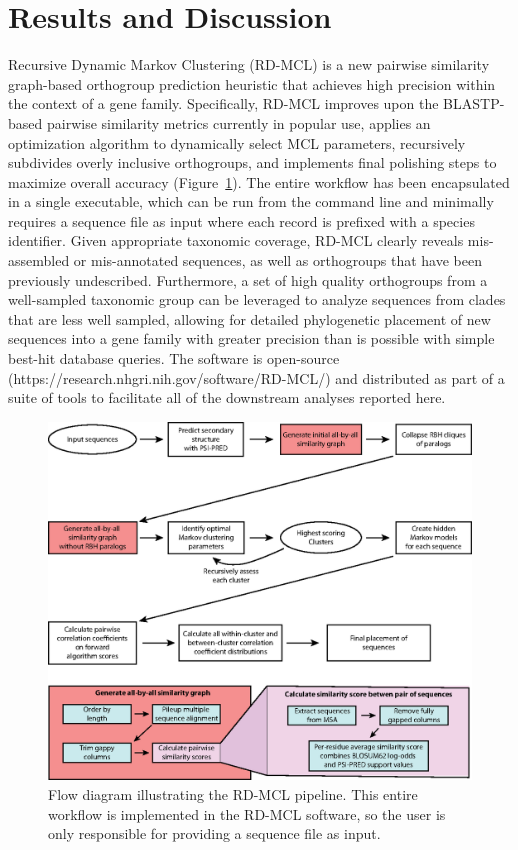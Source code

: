 \documentclass[twocolumn]{bmcart}  %
\begin{document}
\section{Results and Discussion}\label{sec:resultsAndDiscussion}
Recursive Dynamic Markov Clustering (RD-MCL) is a new pairwise similarity graph-based orthogroup prediction heuristic that achieves high precision within the context of a gene family.
Specifically, RD-MCL improves upon the BLASTP-based pairwise similarity metrics currently in popular use, applies an optimization algorithm to dynamically select MCL parameters, recursively subdivides overly inclusive orthogroups, and implements final polishing steps to maximize overall accuracy (Figure~\ref{fig:pipeline}).
The entire workflow has been encapsulated in a single executable, which can be run from the command line and minimally requires a sequence file as input where each record is prefixed with a species identifier.
Given appropriate taxonomic coverage, RD-MCL clearly reveals mis-assembled or mis-annotated sequences, as well as orthogroups that have been previously undescribed.
Furthermore, a set of high quality orthogroups from a well-sampled taxonomic group can be leveraged to analyze sequences from clades that are less well sampled, allowing for detailed phylogenetic placement of new sequences into a gene family with greater precision than is possible with simple best-hit database queries.
The software is open-source (https://research.nhgri.nih.gov/software/RD-MCL/) and distributed as part of a suite of tools to facilitate all of the downstream analyses reported here.

\begin{figure}[t]
  \begin{center}
  \includegraphics[height=0.6\textheight]{../figures/pipeline.eps}
\end{center}
\caption{Flow diagram illustrating the RD-MCL pipeline.
This entire workflow is implemented in the RD-MCL software, so the user is only responsible for providing a sequence file as input.}
\label{fig:pipeline}
\end{figure}
\end{document}
